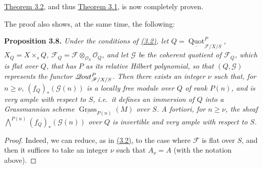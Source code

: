 \documentclass{article}
\newenvironment{itenv}[1]
  {\phantomsection\par\smallskip\noindent\textbf{#1.}\itshape}
  {\par\smallskip}
\theoremstyle{definition}
\theoremstyle{definition}
\theoremstyle{definition}
\theoremstyle{definition}
\theoremstyle{remark}
\begin{document}
\protect\hyperlink{fga-3-iv-theorem-3.2}{Theorem 3.2}, and thus \protect\hyperlink{fga-3-iv-theorem-3.1}{Theorem 3.1}, is now completely proven.

The proof also shows, at the same time, the following:

\leavevmode{}%
\begin{itenv}{Proposition 3.8}
Under the conditions of \protect\hyperlink{fga-3-iv-theorem-3.2}{(3.2)}, let \(Q=\underline{\operatorname{Quot}}_{{{\mathscr{F}}/X/S}}^P\), \(X_Q=X\times_s Q\), \({\mathscr{F}}_Q={\mathscr{F}}\otimes_{{\mathscr{O}}_S}{\mathscr{O}}_Q\), and let \({\mathscr{G}}\) be the coherent quotient of \({\mathscr{F}}_Q\), which is flat over \(Q\), that has \(P\) as its relative Hilbert polynomial, so that \((Q,{\mathscr{G}})\) represents the functor \(\mathscr{Q}\kern -.5pt out_{{{\mathscr{F}}/X/S}}^P\).
Then there exists an integer \(\nu\) such that, for \(n\geqslant\nu\), \((f_Q)_*({\mathscr{G}}(n))\) is a locally free module over \(Q\) of rank \(P(n)\), and is very ample with respect to \(S\), i.e.~it defines an immersion of \(Q\) into a Grassmannian scheme \(\underline{\operatorname{Grass}}_{P(n)}(M)\) over \(S\).
A fortiori, for \(n\geqslant\nu\), the sheaf \(\bigwedge^{P(n)}(f_Q)_*({\mathscr{G}}(n))\) over \(Q\) is invertible and very ample with respect to \(S\).

\end{itenv}

\begin{proof}
Indeed, we can reduce, as in \protect\hyperlink{fga-3-iv-theorem-3.2}{(3.2)}, to the case where \({\mathscr{F}}\) is flat over \(S\), and then it suffices to take an integer \(\nu\) such that \(A_\nu=A\) (with the notation above).
\end{proof}
\end{document}
